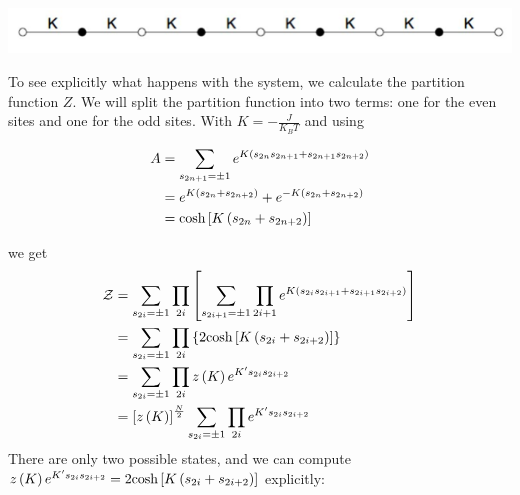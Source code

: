 \noindent
\begin{minipage}{\textwidth}
  \centering
  \includegraphics[height=35pt]{pics/1d_decimation}
  \label{fig:1d_decimation}
\end{minipage}

\vspace{0.2cm}

To see explicitly what happens with the system, we calculate the partition function $Z$. We will split the partition function into two terms: one for the even sites and one for the odd sites. With $K=-\frac{J}{K_BT}$  and using

\begin{align*}
A &= \sum_{s_{2n+1}=\pm 1}{  e^  {K\left(  s_{2n}s_{2n+1}  + s_{2n+1} s_{2n+2}     \right)  } }\\
&=e^  {K\left(  s_{2n}+s_{2n+2}    \right)  }  + e^  {-K\left(  s_{2n}+s_{2n+2}    \right)  } \\
&=\text{cosh}\left[K\left(  s_{2n}+s_{2n+2}    \right) \right]
\end{align*}

we get
\begin{align*}
\mathcal{Z} &= \sum_{s_{2i}=\pm 1}{  \prod_{2i}{   \left[ {  
\sum_{s_{2i+1}=\pm 1}{  \prod_{2i+1}{e^  {K\left(  s_{2i}s_{2i+1}  + s_{2i+1} s_{2i+2}  \right)     }  } }  }\right] } }  \\
&=\sum_{s_{2i}=\pm 1}{  \prod_{2i}{  \left\{2 \text{cosh}\left[K\left(s_{2i}+s_{2i+2}\right)\right]\right\} } }  \\
&=\sum_{s_{2i}=\pm 1}{  \prod_{2i}{  z\left(K\right) e^{K' s_{2i}s_{2i+2} } } }  \\
&=\left[z\left(K\right)\right]^{\frac{N}{2}}\sum_{s_{2i}=\pm 1}{  \prod_{2i}{   e^{K' s_{2i}s_{2i+2} } } }  
\end{align*}
There are only two possible states, and we can compute $z\left(K\right)e^{K's_{2i}s_{2i+2}}= 2\text{cosh}\left[K\left( s_{2i}+s_{2i+2} \right)\right] $ explicitly:

